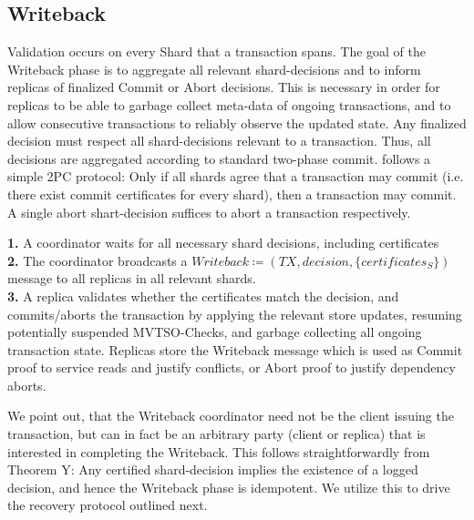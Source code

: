 \subsection{Writeback}

Validation occurs on every Shard that a transaction spans. The goal of the Writeback phase is to aggregate all relevant shard-decisions and to inform replicas of finalized Commit or Abort decisions. This is necessary in order for replicas to be able to garbage collect meta-data of ongoing transactions, and to allow consecutive transactions to reliably observe the updated state. Any finalized decision must respect all shard-decisions relevant to a transaction. Thus, all decisions are aggregated according to standard two-phase commit. \sys follows a simple 2PC protocol: Only if all shards agree that a transaction may commit (i.e. there exist commit certificates for every shard), then a transaction may commit. A single abort shart-decision suffices to abort a transaction respectively.

\textbf{1.} A coordinator waits for all necessary shard decisions, including certificates\\
\textbf{2.} The coordinator broadcasts a $Writeback \coloneqq (TX, decision, \{certificates_S \} )$ message to all replicas in all relevant shards.\\
\textbf{3.} A replica validates whether the certificates match the decision, and commits/aborts the transaction by applying the relevant store updates, resuming potentially suspended MVTSO-Checks, and garbage collecting all ongoing transaction state. Replicas store the Writeback message which is used as Commit proof to service reads and justify conflicts, or Abort proof to justify dependency aborts.

We point out, that the Writeback coordinator need not be the client issuing the transaction, but can in fact be an arbitrary party (client or replica) that is interested in completing the Writeback. This follows straightforwardly from Theorem Y: Any certified shard-decision implies the existence of a logged decision, and hence the Writeback phase is idempotent.
We utilize this to drive the recovery protocol outlined next. 

